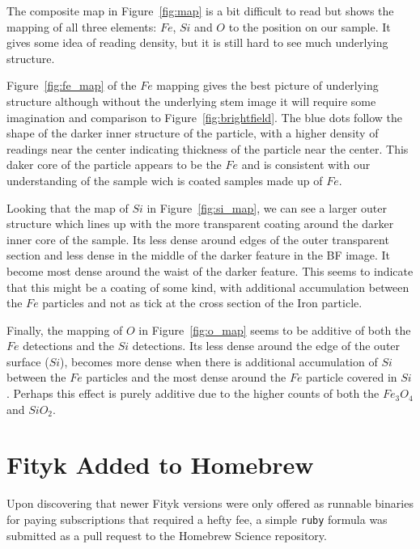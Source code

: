\documentclass[12pt,a4paper]{article}
\begin{document}
The composite map in Figure~\ref{fig:map} is a bit difficult to read but shows the mapping of all three elements: $Fe$, $Si$ and $O$ to the position on our sample.  It gives some idea of reading density, but it is still hard to see much underlying structure.

Figure~\ref{fig:fe_map} of the $Fe$ mapping gives the best picture of underlying structure although without the underlying \ac{stem} image it will require some imagination and comparison to Figure~\ref{fig:brightfield}.  The blue dots follow the shape of the darker inner structure of the particle, with a higher density of readings near the center indicating thickness of the particle near the center.  This daker core of the particle appears to be the $Fe$ and is consistent with our understanding of the sample wich is coated samples made up of $Fe$.

Looking that the map of $Si$ in Figure~\ref{fig:si_map}, we can see a larger outer structure which lines up with the more transparent coating around the darker inner core of the sample.  Its less dense around edges of the outer transparent section and less dense in the middle of the darker feature in the BF image.  It become most dense around the waist of the darker feature.  This seems to indicate that this might be a coating of some kind, with additional accumulation between the $Fe$ particles and not as tick at the cross section of the Iron particle.

Finally, the mapping of $O$ in Figure~\ref{fig:o_map} seems to be additive of both the $Fe$ detections and the $Si$ detections.  Its less dense around the edge of the outer surface ($Si$), becomes more dense when there is additional accumulation of $Si$ between the $Fe$ particles and the most dense around the $Fe$ particle covered in $Si$.  Perhaps this effect is purely additive due to the higher counts of both the $Fe_3O_4$ and $SiO_2$.


\section{Fityk Added to Homebrew} %
\label{sec:fityk_homebrew}

Upon discovering that newer Fityk versions were only offered as runnable binaries for paying subscriptions that required a hefty fee, a simple \texttt{ruby} formula was submitted as a pull request to the Homebrew Science repository\cite{hbs}.
\end{document}
